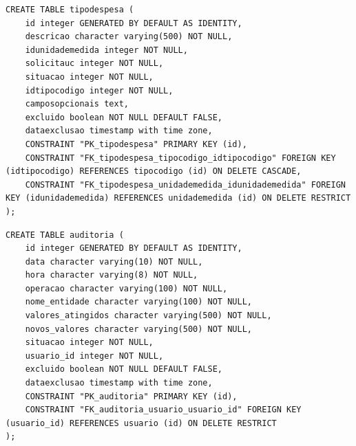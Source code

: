 \begin{quadro}[H]
\caption{Script SQL — Tabela tipodespesa}
\label{qua:script-tipodespesa}
\begin{minipage}{0.96\textwidth}
\begin{lstlisting}[style=academic-sql]
CREATE TABLE tipodespesa (
    id integer GENERATED BY DEFAULT AS IDENTITY,
    descricao character varying(500) NOT NULL,
    idunidademedida integer NOT NULL,
    solicitauc integer NOT NULL,
    situacao integer NOT NULL,
    idtipocodigo integer NOT NULL,
    camposopcionais text,
    excluido boolean NOT NULL DEFAULT FALSE,
    dataexclusao timestamp with time zone,
    CONSTRAINT "PK_tipodespesa" PRIMARY KEY (id),
    CONSTRAINT "FK_tipodespesa_tipocodigo_idtipocodigo" FOREIGN KEY (idtipocodigo) REFERENCES tipocodigo (id) ON DELETE CASCADE,
    CONSTRAINT "FK_tipodespesa_unidademedida_idunidademedida" FOREIGN KEY (idunidademedida) REFERENCES unidademedida (id) ON DELETE RESTRICT
);
\end{lstlisting}
\end{minipage}
\end{quadro}

\begin{quadro}[H]
\caption{Script SQL — Tabela auditoria}
\label{qua:script-auditoria}
\begin{minipage}{0.96\textwidth}
\begin{lstlisting}[style=academic-sql]
CREATE TABLE auditoria (
    id integer GENERATED BY DEFAULT AS IDENTITY,
    data character varying(10) NOT NULL,
    hora character varying(8) NOT NULL,
    operacao character varying(100) NOT NULL,
    nome_entidade character varying(100) NOT NULL,
    valores_atingidos character varying(500) NOT NULL,
    novos_valores character varying(500) NOT NULL,
    situacao integer NOT NULL,
    usuario_id integer NOT NULL,
    excluido boolean NOT NULL DEFAULT FALSE,
    dataexclusao timestamp with time zone,
    CONSTRAINT "PK_auditoria" PRIMARY KEY (id),
    CONSTRAINT "FK_auditoria_usuario_usuario_id" FOREIGN KEY (usuario_id) REFERENCES usuario (id) ON DELETE RESTRICT
);
\end{lstlisting}
\end{minipage}
\end{quadro}

